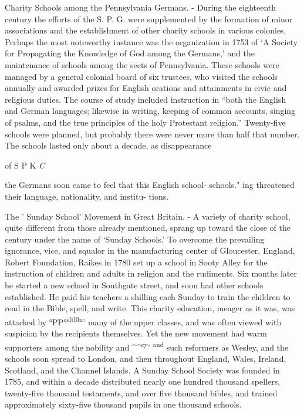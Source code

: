 \documentclass[
]{book}
\begin{document}
Charity Schools among the Pennsylvania Germans. - During the eighteenth century the efforts of the S. P. G. were supplemented by the formation of minor associations and the establishment of other charity schools in various colonies. Perhaps the most noteworthy instance was the organization in 1753 of `A Society for Propagating the Knowledge of God among the Germans,' and the maintenance of schools among the sects of Pennsylvania. These schools were managed by a general colonial board of six trustees, who visited the schools annually and awarded prizes for English orations and attainments in civic and religious duties. The course of study included instruction in ``both the English and German languages; likewise in writing, keeping of common accounts, singing of psalms, and the true principles of the holy Protestant religion.'' Twenty-five schools were planned, but probably there were never more than half\protect\hypertarget{ch20.xmlux5cux23para.296.1.0.box.132.228.1247.38.q.70}{}{ that number. The schools lasted only about a decade, as disappearance}

of S P K \emph{C}

the Germans soon came to feel that this English school- schools." ing threatened their language, nationality, and institu- tions.

The ' Sunday School' Movement in Great Britain. - A variety of charity school, quite different from those already mentioned, sprang up toward the close of the century under the name of `Sunday Schools.' To overcome the prevailing ignorance, vice, and squalor in the manufacturing center of Gloucester, England, Robert Foundation, Raikes in 1780 set up a school in Sooty Alley for the instruction of children and adults in religion and the rudiments. Six months later he started a new school in Southgate street, and soon had other schools established. He paid his teachers a shilling each Sunday to train the children to read in the Bible, spell, and write. This charity education, meager as it was, was attacked by °PP°\textsuperscript{sltl0n}' many of the upper classes, and was often viewed with suspicion by the recipients themselves. Yet the new movement had warm supporters among the nobility and \^{}\^{}\textsuperscript{cy}' \textsuperscript{and} such reformers as Wesley, and the schools soon spread to London, and then throughout England, Wales, Ireland, Scotland, and the Channel Islands. A Sunday School Society was founded in 1785, and within a decade distributed nearly one hundred thousand spellers, twenty-five thousand testaments, and over five thousand bibles, and trained approximately sixty-five thousand pupils in one thousand schools.
\end{document}
